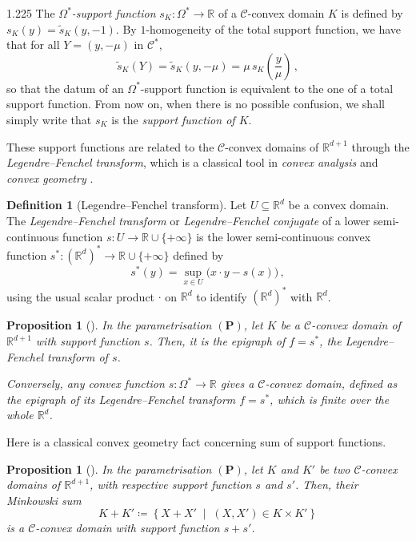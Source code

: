 \documentclass[reqno, a4paper]{amsart}
\numberwithin{equation}{section}
\numberwithin{figure}{section}
\newtheorem{proposition}[theorem]{Proposition}
\theoremstyle{definition}
\newtheorem{definition}[theorem]{Definition}
\theoremstyle{remark}
\newcommand{\R}{\mathbb{R}} %
\newcommand{\C}{\mathcal{C}} %
\newcommand{\st}{\; \middle\vert \;} %
\newcommand{\vp}[1]{{\left( {#1} \right)}} %
\newcommand{\bp}[1]{{\bigl( {#1} \bigr)}} %
\begin{document}
\begin{spacing}{1.225}
The \emph{$\Omega^*$-support function} $s_K:\Omega^* \to \R$ of a $\C$-convex domain $K$ is defined by $s_K (y)=\tilde{s}_K(y,-1)$. By $1$-homogeneity of the total support function, we have that for all $Y = (y,-\mu)$ in $\C^*$,
\begin{equation*}
\tilde{s}_K(Y)=\tilde{s}_K(y,-\mu)=\mu \, s_K\vp{\frac{y}{\mu}} \, ,
\end{equation*}
so that the datum of an $\Omega^*$-support function is equivalent to the one of a total support function. From now on, when there is no possible confusion, we shall simply write that $s_K$ is the \emph{support function of $K$}. 

These support functions are related to the $\C$-convex domains of $\R^{d+1}$ through the \emph{Legendre--Fenchel transform}, which is a classical tool in \emph{convex analysis} \cite{Rockafellar_97} and \emph{convex geometry} \cite{Schneider_93}. 

\begin{definition}[Legendre--Fenchel transform]
\label{def Legendre--Fenchel transform}
Let $U \subseteq \R^d$ be a convex domain. The \emph{Legendre--Fenchel transform} or \emph{Legendre--Fenchel conjugate} of a lower semi-continuous function $s: U \to \R \cup \{+\infty\}$ is the lower semi-continuous convex function $s^*:(\R^d)^* \to \R \cup \{+\infty\}$ defined by 
\begin{equation*}
s^*(y) = \sup_{x \in U}\bp{x \cdot y - s(x)} \, ,
\end{equation*}
using the usual scalar product $\cdot$ on $\R^d$ to identify $(\R^d)^*$ with $\R^d$. 
\end{definition}

\begin{proposition}[{\cite[Proposition~4.9]{Ablondi_25}}]
\label{prop K is epigraph}
In the parametrisation $(\mathbf{P})$, let $K$ be a $\C$-convex domain of $\R^{d+1}$ with support function $s$. Then, it is the epigraph of $f=s^*$, the Legendre--Fenchel transform of $s$. 

Conversely, any convex function $s:\Omega^* \to \R$ gives a $\C$-convex domain, defined as the epigraph of its Legendre--Fenchel transform $f=s^*$, which is finite over the whole $\R^d$. 
\end{proposition}

Here is a classical convex geometry fact \cite[Theorem~1.7.5]{Schneider_93} concerning sum of support functions. 

\begin{proposition}[{\cite[Proposition 4.10]{Ablondi_25}}]
\label{prop support function and sum}
In the parametrisation $(\mathbf{P})$, let $K$ and $K'$ be two $\C$-convex domains of $\R^{d+1}$, with respective support function $s$ and $s'$. Then, their \emph{Minkowski sum}
\begin{equation*}
 K+K'\coloneqq \left\lbrace X+X' \st (X,X')\in K\times K' \right\rbrace
\end{equation*}
is a $\C$-convex domain with support function $s+s'$.
\end{proposition}


\end{spacing}
\end{document}
